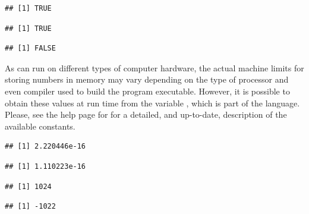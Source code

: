 \documentclass[krantz2]{krantz}\usepackage{knitr}%
\begin{document}
\begin{explainbox}
\begin{knitrout}\footnotesize
{}\color{fgcolor}\begin{kframe}
\begin{alltt}
 \hlopt{==}  \hlopt{+} 
\end{alltt}
\begin{verbatim}
## [1] TRUE
\end{verbatim}
\begin{alltt}
 \hlopt{==}  \hlopt{+} 
\end{alltt}
\begin{verbatim}
## [1] TRUE
\end{verbatim}
\begin{alltt}
 \hlopt{==} 
\end{alltt}
\begin{verbatim}
## [1] FALSE
\end{verbatim}
\end{kframe}
\end{knitrout}

As \Rpgrm can run on different types of computer hardware, the actual machine limits for storing numbers in memory may vary depending on the type of processor and even compiler used to build the \Rpgrm program executable. However, it is possible to obtain these values at run time from the variable , which is part of the \Rlang language. Please, see the help page for  for a detailed, and up-to-date, description of the available constants.

\begin{knitrout}\footnotesize
{}\color{fgcolor}\begin{kframe}
\begin{alltt}
\hlopt{$}
\end{alltt}
\begin{verbatim}
## [1] 2.220446e-16
\end{verbatim}
\begin{alltt}
\hlopt{$}
\end{alltt}
\begin{verbatim}
## [1] 1.110223e-16
\end{verbatim}
\begin{alltt}
\hlopt{$}
\end{alltt}
\begin{verbatim}
## [1] 1024
\end{verbatim}
\begin{alltt}
\hlopt{$}
\end{alltt}
\begin{verbatim}
## [1] -1022
\end{verbatim}
\end{kframe}
\end{knitrout}


\end{explainbox}
\end{document}
